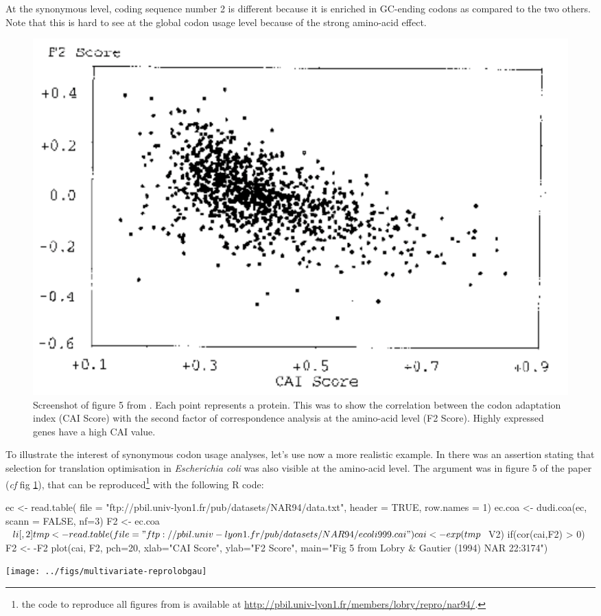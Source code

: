 \documentclass{article}
\begin{document}
At the synonymous level, coding sequence number 2 is different because it is enriched in GC-ending codons
as compared to the two others. Note that this is hard to see at the global codon usage level because of the
strong amino-acid effect.

\begin{figure}[htbp]
   \begin{center}
      \includegraphics{../figs/lobgau5}
   \end{center}
   \caption{Screenshot of figure 5 from \cite{lobrygautier}. Each point represents
   a protein. This was to show the correlation between the codon adaptation index (CAI Score)
   with the second factor of correspondence analysis at the amino-acid level (F2 Score). Highly
   expressed genes have a high CAI value.
   }
   \label{lobgau5}
\end{figure}


To illustrate the interest of synonymous codon usage analyses, let's use now a more realistic example.
In \cite{lobrygautier} there was an assertion stating that selection for
translation optimisation in \textit{Escherichia coli} was also visible at the amino-acid level.
The argument was in figure 5 of the paper (\textit{cf} fig \ref{lobgau5}), that can be reproduced\footnote{
  the code to reproduce all figures from \cite{lobrygautier} is available at
  \url{http://pbil.univ-lyon1.fr/members/lobry/repro/nar94/}.
} with the following R code:

%
%
\begin{Schunk}
\begin{Sinput}
 ec <- read.table(
      file = "ftp://pbil.univ-lyon1.fr/pub/datasets/NAR94/data.txt",
      header = TRUE,
      row.names = 1)
 ec.coa <- dudi.coa(ec, scann = FALSE, nf=3)
 F2 <- ec.coa$li[,2]
 tmp <- read.table(
      file = "ftp://pbil.univ-lyon1.fr/pub/datasets/NAR94/ecoli999.cai")
 cai <- exp(tmp$V2)
 if(cor(cai,F2) > 0) F2 <- -F2
 plot(cai, F2, pch=20, xlab="CAI Score", ylab="F2 Score",
      main="Fig 5 from Lobry & Gautier (1994) NAR 22:3174")
\end{Sinput}
\end{Schunk}
\texttt{[image: ../figs/multivariate-reprolobgau]}
\end{document}
